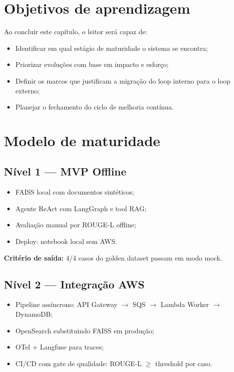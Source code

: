 \section{Objetivos de aprendizagem}

Ao concluir este cap\'itulo, o leitor ser\'a capaz de:

\begin{itemize}[leftmargin=*]
  \item Identificar em qual est\'agio de maturidade o sistema se encontra;
  \item Priorizar evolu\c{c}\~oes com base em impacto e esfor\c{c}o;
  \item Definir os marcos que justificam a migra\c{c}\~ao do loop interno
        para o loop externo;
  \item Planejar o fechamento do ciclo de melhoria cont\'inua.
\end{itemize}

\section{Modelo de maturidade}

\subsection{N\'ivel 1 --- MVP Offline}

\begin{itemize}[leftmargin=*]
  \item FAISS local com documentos sint\'eticos;
  \item Agente ReAct com LangGraph e tool RAG;
  \item Avalia\c{c}\~ao manual por ROUGE-L offline;
  \item Deploy: notebook local sem AWS.
\end{itemize}

\textbf{Crit\'erio de sa\'ida:} 4/4 casos do golden dataset passam em modo mock.

\subsection{N\'ivel 2 --- Integra\c{c}\~ao AWS}

\begin{itemize}[leftmargin=*]
  \item Pipeline ass\'incrono: API Gateway $\to$ SQS $\to$ Lambda Worker
        $\to$ DynamoDB;
  \item OpenSearch substituindo FAISS em produ\c{c}\~ao;
  \item OTel + Langfuse para traces;
  \item CI/CD com gate de qualidade: ROUGE-L $\geq$ threshold por caso.
\end{itemize}

